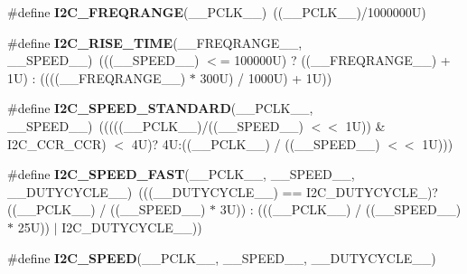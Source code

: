 \begin{DoxyCompactItemize}
\item 
\mbox{\label{group___i2_c___private___macros_ga9b4e4686872c7b0bd9daed9049d0c431}} 
\#define {\bfseries I2\+C\+\_\+\+F\+R\+E\+Q\+R\+A\+N\+GE}(\+\_\+\+\_\+\+P\+C\+L\+K\+\_\+\+\_\+)~((\+\_\+\+\_\+\+P\+C\+L\+K\+\_\+\+\_\+)/1000000\+U)
\item 
\mbox{\label{group___i2_c___private___macros_ga27cae7b1432cd160ab708e1548ba3165}} 
\#define {\bfseries I2\+C\+\_\+\+R\+I\+S\+E\+\_\+\+T\+I\+ME}(\+\_\+\+\_\+\+F\+R\+E\+Q\+R\+A\+N\+G\+E\+\_\+\+\_\+,  \+\_\+\+\_\+\+S\+P\+E\+E\+D\+\_\+\+\_\+)~(((\+\_\+\+\_\+\+S\+P\+E\+E\+D\+\_\+\+\_\+) $<$= 100000\+U) ? ((\+\_\+\+\_\+\+F\+R\+E\+Q\+R\+A\+N\+G\+E\+\_\+\+\_\+) + 1\+U) \+: ((((\+\_\+\+\_\+\+F\+R\+E\+Q\+R\+A\+N\+G\+E\+\_\+\+\_\+) $\ast$ 300\+U) / 1000\+U) + 1\+U))
\item 
\mbox{\label{group___i2_c___private___macros_gaa71590c93b126e79fc86afbc819742b3}} 
\#define {\bfseries I2\+C\+\_\+\+S\+P\+E\+E\+D\+\_\+\+S\+T\+A\+N\+D\+A\+RD}(\+\_\+\+\_\+\+P\+C\+L\+K\+\_\+\+\_\+,  \+\_\+\+\_\+\+S\+P\+E\+E\+D\+\_\+\+\_\+)~(((((\+\_\+\+\_\+\+P\+C\+L\+K\+\_\+\+\_\+)/((\+\_\+\+\_\+\+S\+P\+E\+E\+D\+\_\+\+\_\+) $<$$<$ 1\+U)) \& I2\+C\+\_\+\+C\+C\+R\+\_\+\+C\+C\+R) $<$ 4\+U)? 4\+U\+:((\+\_\+\+\_\+\+P\+C\+L\+K\+\_\+\+\_\+) / ((\+\_\+\+\_\+\+S\+P\+E\+E\+D\+\_\+\+\_\+) $<$$<$ 1\+U)))
\item 
\mbox{\label{group___i2_c___private___macros_ga9e5a85344d70ab05020e41ba24566f57}} 
\#define {\bfseries I2\+C\+\_\+\+S\+P\+E\+E\+D\+\_\+\+F\+A\+ST}(\+\_\+\+\_\+\+P\+C\+L\+K\+\_\+\+\_\+,  \+\_\+\+\_\+\+S\+P\+E\+E\+D\+\_\+\+\_\+,  \+\_\+\+\_\+\+D\+U\+T\+Y\+C\+Y\+C\+L\+E\+\_\+\+\_\+)~(((\+\_\+\+\_\+\+D\+U\+T\+Y\+C\+Y\+C\+L\+E\+\_\+\+\_\+) == I2\+C\+\_\+\+D\+U\+T\+Y\+C\+Y\+C\+L\+E\+\_)? ((\+\_\+\+\_\+\+P\+C\+L\+K\+\_\+\+\_\+) / ((\+\_\+\+\_\+\+S\+P\+E\+E\+D\+\_\+\+\_\+) $\ast$ 3\+U)) \+: (((\+\_\+\+\_\+\+P\+C\+L\+K\+\_\+\+\_\+) / ((\+\_\+\+\_\+\+S\+P\+E\+E\+D\+\_\+\+\_\+) $\ast$ 25\+U)) $\vert$ I2\+C\+\_\+\+D\+U\+T\+Y\+C\+Y\+C\+L\+E\+\_\+\_))
\item 
\#define {\bfseries I2\+C\+\_\+\+S\+P\+E\+ED}(\+\_\+\+\_\+\+P\+C\+L\+K\+\_\+\+\_\+,  \+\_\+\+\_\+\+S\+P\+E\+E\+D\+\_\+\+\_\+,  \+\_\+\+\_\+\+D\+U\+T\+Y\+C\+Y\+C\+L\+E\+\_\+\+\_\+)

\end{DoxyCompactItemize}
